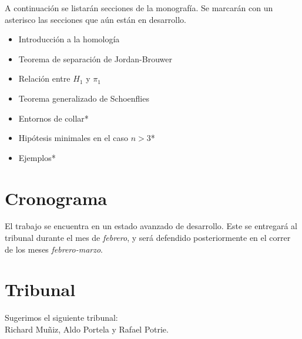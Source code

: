 \documentclass[11pt]{article}
\begin{document}
A continuación se listarán secciones de la monografía. Se marcarán con un asterisco las secciones que aún están en desarrollo.

\begin{itemize}
    \item Introducción a la homología
    \item Teorema de separación de Jordan-Brouwer
    \item Relación entre $H_1$ y $\pi_1$
    \item Teorema generalizado de Schoenflies
    \item Entornos de collar*
    \item Hipótesis minimales en el caso $n>3$*
    \item Ejemplos*
\end{itemize}

% 

% 

% 

% 

% 

% 

% 

% 

% 

% 

% 

% 


\section*{Cronograma}

El trabajo se encuentra en un estado avanzado de desarrollo. Este se entregará al tribunal durante el mes de \textit{febrero}, y será defendido posteriormente en el correr de los meses \textit{febrero-marzo}.

\section*{Tribunal}

\noindent Sugerimos el siguiente tribunal:\\

Richard Muñiz, Aldo Portela y Rafael Potrie. \\
\end{document}
